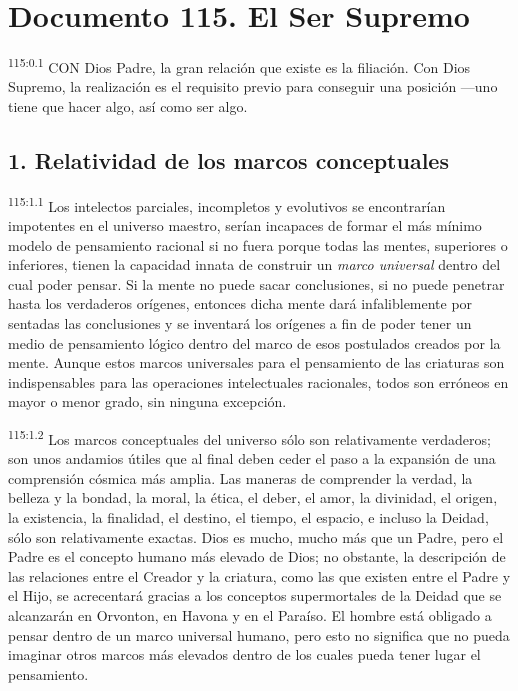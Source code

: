 \chapter{Documento 115. El Ser Supremo}
\par
\textsuperscript{115:0.1} CON Dios Padre, la gran relación que existe es la filiación. Con Dios Supremo, la realización es el requisito previo para conseguir una posición ---uno tiene que hacer algo, así como ser algo.

\section*{1. Relatividad de los marcos conceptuales}
\par
\textsuperscript{115:1.1} Los intelectos parciales, incompletos y evolutivos se encontrarían impotentes en el universo maestro, serían incapaces de formar el más mínimo modelo de pensamiento racional si no fuera porque todas las mentes, superiores o inferiores, tienen la capacidad innata de construir un \textit{marco universal} dentro del cual poder pensar. Si la mente no puede sacar conclusiones, si no puede penetrar hasta los verdaderos orígenes, entonces dicha mente dará infaliblemente por sentadas las conclusiones y se inventará los orígenes a fin de poder tener un medio de pensamiento lógico dentro del marco de esos postulados creados por la mente. Aunque estos marcos universales para el pensamiento de las criaturas son indispensables para las operaciones intelectuales racionales, todos son erróneos en mayor o menor grado, sin ninguna excepción.

\par
\textsuperscript{115:1.2} Los marcos conceptuales del universo sólo son relativamente verdaderos; son unos andamios útiles que al final deben ceder el paso a la expansión de una comprensión cósmica más amplia. Las maneras de comprender la verdad, la belleza y la bondad, la moral, la ética, el deber, el amor, la divinidad, el origen, la existencia, la finalidad, el destino, el tiempo, el espacio, e incluso la Deidad, sólo son relativamente exactas. Dios es mucho, mucho más que un Padre, pero el Padre es el concepto humano más elevado de Dios; no obstante, la descripción de las relaciones entre el Creador y la criatura, como las que existen entre el Padre y el Hijo, se acrecentará gracias a los conceptos supermortales de la Deidad que se alcanzarán en Orvonton, en Havona y en el Paraíso. El hombre está obligado a pensar dentro de un marco universal humano, pero esto no significa que no pueda imaginar otros marcos más elevados dentro de los cuales pueda tener lugar el pensamiento.

